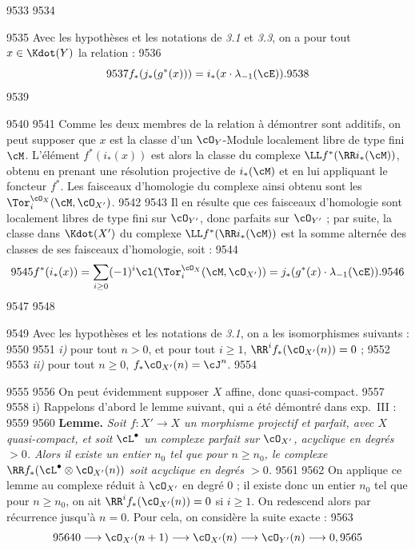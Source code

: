   9533	
  9534	\begin{proposition}[3.4]
  9535	Avec les hypoth\`eses et les notations de \emph{3.1} et \emph{3.3}, on a pour tout $x \in \Kdot(Y)$ la relation :
  9536	\[
  9537	f_{*}(j_{*}(g^{*}(x))) = i_{*}(x \cdot \lambda_{-1}(\cE)).
  9538	\]
  9539	\end{proposition}
  9540	
  9541	Comme les deux membres de la relation \`a d\'emontrer sont additifs, on peut supposer que $x$ est la classe d'un $\cO_Y$-Module localement libre de type fini $\cM$. L'\'el\'ement $f^{*}(i_{*}(x))$ est alors la classe du complexe $\LL f^{*}(\RR i_{*}(\cM))$, obtenu en prenant une r\'esolution projective de $i_{*}(\cM)$ et en lui appliquant le foncteur $f^{*}$. Les faisceaux d'homologie du complexe ainsi obtenu sont les $\Tor_i^{\cO_X}(\cM, \cO_{X'})$.
  9542	
  9543	Il en r\'esulte que ces faisceaux d'homologie sont localement libres de type fini sur $\cO_{Y'}$, donc parfaits sur $\cO_{Y'}$ ; par suite, la classe dans $\Kdot(X')$ du complexe $\LL f^{*}(\RR i_{*}(\cM))$ est la somme altern\'ee des classes de ses faisceaux d'homologie, soit :
  9544	\[
  9545	f^{*}(i_{*}(x)) = \sum_{i \geq 0} (-1)^i \cl(\Tor_i^{\cO_X}(\cM, \cO_{X'})) = j_{*}(g^{*}(x) \cdot \lambda_{-1}(\cE)).
  9546	\]
  9547	
  9548	\begin{lemme}[3.5]
  9549	Avec les hypoth\`eses et les notations de \emph{3.1}, on a les isomorphismes suivants :
  9550	
  9551	\emph{i)} pour tout $n > 0$, et pour tout $i \geq 1$, $\RR^i f_{*}(\cO_{X'}(n)) = 0$ ;
  9552	
  9553	\emph{ii)} pour tout $n \geq 0$, $f_{*}\cO_{X'}(n) = \cJ^n$.
  9554	\end{lemme}
  9555	
  9556	On peut \'evidemment supposer $X$ affine, donc quasi-compact.
  9557	
  9558	i) Rappelons d'abord le lemme suivant, qui a \'et\'e d\'emontr\'e dans exp.~III :
  9559	
  9560	\textbf{Lemme.} \textit{Soit $f: X' \to X$ un morphisme projectif et parfait, avec $X$ quasi-compact, et soit $\cL^{\bullet}$ un complexe parfait sur $\cO_{X'}$, acyclique en degr\'es $> 0$. Alors il existe un entier $n_0$ tel que pour $n \geq n_0$, le complexe $\RR f_{*}(\cL^{\bullet} \otimes \cO_{X'}(n))$ soit acyclique en degr\'es $> 0$.}
  9561	
  9562	On applique ce lemme au complexe r\'eduit \`a $\cO_{X'}$ en degr\'e $0$ ; il existe donc un entier $n_0$ tel que pour $n \geq n_0$, on ait $\RR^i f_{*}(\cO_{X'}(n)) = 0$ si $i \geq 1$. On redescend alors par r\'ecurrence jusqu'\`a $n = 0$. Pour cela, on consid\`ere la suite exacte :
  9563	\[
  9564	0 \longrightarrow \cO_{X'}(n+1) \longrightarrow \cO_{X'}(n) \longrightarrow \cO_{Y'}(n) \longrightarrow 0,
  9565	\]
